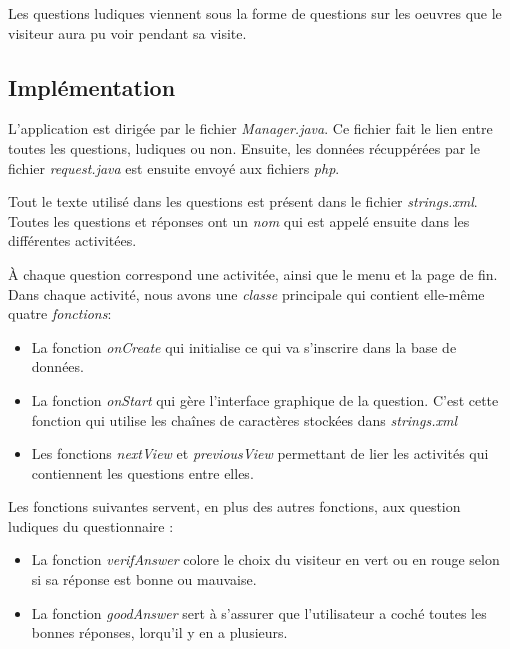 \documentclass[12]{report}
\begin{document}
  Les questions ludiques viennent sous la forme de questions sur les oeuvres que le visiteur aura pu voir pendant sa visite.


  \subsection{Implémentation}

  L'application est dirigée par le fichier \emph{Manager.java}. Ce fichier fait le lien entre toutes les questions, ludiques ou non. Ensuite, les données récuppérées par le fichier \emph{request.java} est ensuite envoyé aux fichiers \emph{php}. \par

  Tout le texte utilisé dans les questions est présent dans le fichier \emph{strings.xml}. Toutes les questions et réponses ont un \emph{nom} qui est appelé ensuite dans les différentes activitées. \par

  À chaque question correspond une activitée, ainsi que le menu et la page de fin.
  Dans chaque activité, nous avons une \emph{classe} principale qui contient elle-même quatre \emph{fonctions}: \\
    \begin{itemize}
        \item La fonction \emph{onCreate} qui initialise ce qui va s'inscrire dans la base de données.
        \item La fonction \emph{onStart} qui gère l'interface graphique de la question. C'est cette fonction qui utilise les chaînes de caractères stockées dans \emph{strings.xml}
        \item Les fonctions \emph{nextView} et \emph{previousView} permettant de lier les activités qui contiennent les questions entre elles. \\
    \end{itemize}

  Les fonctions suivantes servent, en plus des autres fonctions, aux question ludiques du questionnaire : \\
  \begin{itemize}
      \item La fonction \emph{verifAnswer} colore le choix du visiteur en vert ou en rouge selon si sa réponse est bonne ou mauvaise.
        \item La fonction \emph{goodAnswer} sert à s'assurer que l'utilisateur a coché toutes les bonnes réponses, lorqu'il y en a plusieurs.

  \end{itemize}
\end{document}
